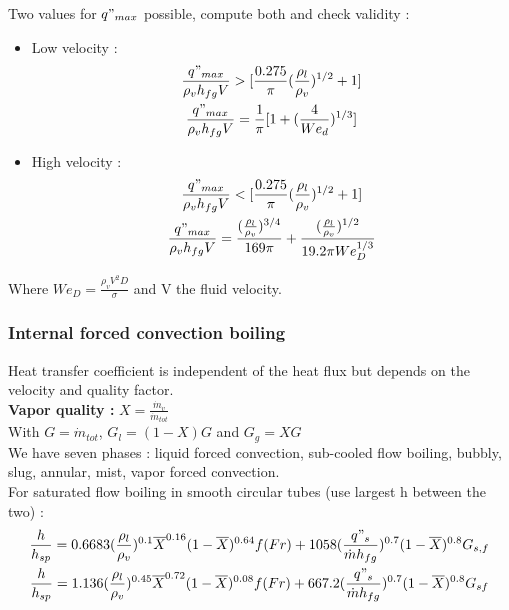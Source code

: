 \documentclass[../main.tex]{subfiles}
\begin{document}
Two values for $q"_{max}$ possible, compute both and check validity : \begin{itemize}
    \item Low velocity : \begin{equation}
        \begin{gathered}
            \frac{q"_{max}}{\rho_v h_{fg} V} > [\frac{0.275}{\pi} (\frac{\rho_l}{\rho_v})^{1/2} + 1]\\
            \frac{q"_{max}}{\rho_v h_{fg} V} = \frac{1}{\pi} [1+(\frac{4}{We_d})^{1/3}]\\
        \end{gathered}
    \end{equation}
    \item High velocity : \begin{equation}
        \begin{gathered}
            \frac{q"_{max}}{\rho_v h_{fg} V} < [\frac{0.275}{\pi} (\frac{\rho_l}{\rho_v})^{1/2} + 1]\\
            \frac{q"_{max}}{\rho_v h_{fg} V} = \frac{(\frac{\rho_l}{\rho_v})^{3/4}}{169\pi} + \frac{(\frac{\rho_l}{\rho_v})^{1/2}}{19.2\pi We_D^{1/3}}\\
        \end{gathered}
    \end{equation}
\end{itemize}
Where $We_D = \frac{\rho_v V^2 D}{\sigma}$ and V the fluid velocity.\\

\subsubsection{Internal forced convection boiling}
Heat transfer coefficient is independent of the heat flux but depends on the velocity and quality factor. \\
\textbf{Vapor quality :} $X = \frac{\dot{m}_v}{\dot{m}_{tot}}$\\
With $G = \dot{m}_{tot}$, $G_l = (1-X)G$ and $G_g = XG$\\

We have seven phases : liquid forced convection, sub-cooled flow boiling, bubbly, slug, annular, mist, vapor forced convection.\\

For saturated flow boiling in smooth circular tubes (use largest h between the two) : \begin{equation}
    \begin{gathered}
        \frac{h}{h_{sp}} = 0.6683 (\frac{\rho_l}{\rho_v})^{0.1} \overline{X}^{0.16} (1-\overline{X})^{0.64} f(Fr) + 1058(\frac{q"_s}{\dot{m} h_{fg}})^{0.7} (1-\overline{X})^{0.8} G_{s,f}\\
        \frac{h}{h_{sp}} = 1.136 (\frac{\rho_l}{\rho_v})^{0.45} \overline{X}^{0.72} (1-\overline{X})^{0.08} f(Fr) + 667.2(\frac{q"_s}{\dot{m}h_{fg}})^{0.7} (1-\overline{X})^{0.8} G_{sf}\\
    \end{gathered}
\end{equation}
\end{document}
